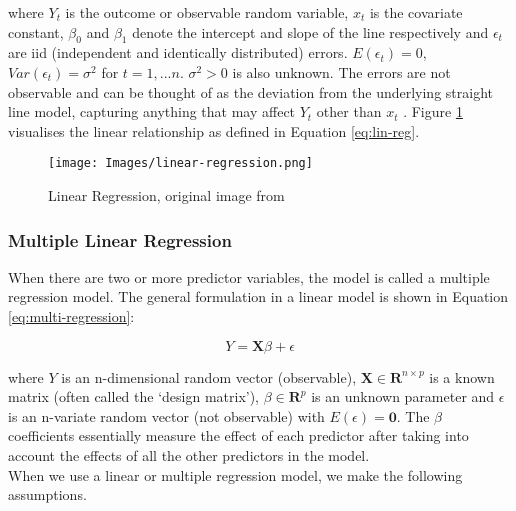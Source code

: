 where $Y_t$ is the outcome or observable random variable, $x_t$ is the covariate constant, $\beta_0$ and $\beta_1$ denote the intercept and slope of the line respectively and $\epsilon_t$ are iid (independent and identically distributed) errors. $E(\epsilon_t) = 0$, $Var(\epsilon_t) = \sigma^2$ for $t = 1,...n$. $\sigma^2 > 0$ is also unknown. The errors are not observable and can be thought of as the deviation from the underlying straight line model, capturing anything that may affect $Y_t$ other than $x_t$ \cite{forecasting-book}. Figure \ref{fig:lin-reg} visualises the linear relationship as defined in Equation \ref{eq:lin-reg}.

\begin{figure}[H]
\begin{center}
    \texttt{[image: Images/linear-regression.png]}
    \caption{Linear Regression, original image from \cite{forecasting-book}}
    \label{fig:lin-reg}
\end{center}
\end{figure}

\subsubsection{Multiple Linear Regression}

When there are two or more predictor variables, the model is called a multiple regression model. The general formulation in a linear model is shown in Equation \ref{eq:multi-regression}:

\begin{equation}
    Y = \mathbf{X}\beta + \epsilon
    \label{eq:multi-regression}
\end{equation}

where $Y$ is an n-dimensional random vector (observable), $\mathbf{X} \in \mathbf{R} ^{n \times p}$ is a known matrix (often called the `design matrix'), $\beta \in \mathbf{R}^p$ is an unknown parameter and $\epsilon$ is an n-variate random vector (not observable) with $E(\epsilon) = \mathbf{0}$. The $\beta$ coefficients essentially measure the effect of each predictor after taking into account the effects of all the other predictors in the model. \\

When we use a linear or multiple regression model, we make the following assumptions.

